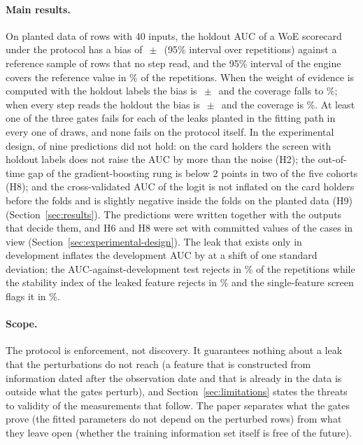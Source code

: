 \paragraph{Main results.} On planted data of  rows with 40 inputs, the holdout AUC of a WoE scorecard under the protocol has a bias of $\,\pm\,$ (95\% interval over  repetitions) against a reference sample of  rows that no step read, and the 95\% interval of the engine covers the reference value in \% of the repetitions. When the weight of evidence is computed with the holdout labels the bias is $\,\pm\,$ and the coverage falls to \%; when every step reads the holdout the bias is $\,\pm\,$ and the coverage is \%. At least one of the three gates fails for each of the  leaks planted in the fitting path in every one of  draws, and none fails on the protocol itself. In the experimental design,  of nine predictions did not hold: on the card holders the screen with holdout labels does not raise the AUC by more than the noise (H2); the out-of-time gap of the gradient-boosting rung is below 2 points in two of the five cohorts (H8); and the cross-validated AUC of the logit is not inflated on the card holders before the folds and is slightly negative inside the folds on the planted data (H9) (Section~\ref{sec:results}). The predictions were written together with the outputs that decide them, and H6 and H8 were set with committed values of the cases in view (Section~\ref{sec:experimental-design}). The leak that exists only in development inflates the development AUC by  at a shift of one standard deviation; the AUC-against-development test rejects in \% of the repetitions while the stability index of the leaked feature rejects in \% and the single-feature screen flags it in \%.

\paragraph{Scope.} The protocol is enforcement, not discovery. It guarantees nothing about a leak that the perturbations do not reach (a feature that is constructed from information dated after the observation date and that is already in the data is outside what the gates perturb), and Section~\ref{sec:limitations} states the threats to validity of the measurements that follow. The paper separates what the gates prove (the fitted parameters do not depend on the perturbed rows) from what they leave open (whether the training information set itself is free of the future).
